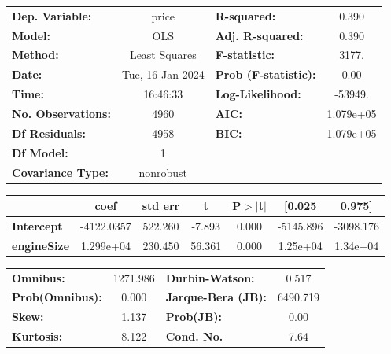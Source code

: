 \documentclass[
  letterpaper,
  DIV=11,
  numbers=noendperiod]{scrreprt}
\begin{document}
\begin{center}
\begin{tabular}{lclc}
\toprule
\textbf{Dep. Variable:}    &      price       & \textbf{  R-squared:         } &     0.390   \\
\textbf{Model:}            &       OLS        & \textbf{  Adj. R-squared:    } &     0.390   \\
\textbf{Method:}           &  Least Squares   & \textbf{  F-statistic:       } &     3177.   \\
\textbf{Date:}             & Tue, 16 Jan 2024 & \textbf{  Prob (F-statistic):} &     0.00    \\
\textbf{Time:}             &     16:46:33     & \textbf{  Log-Likelihood:    } &   -53949.   \\
\textbf{No. Observations:} &        4960      & \textbf{  AIC:               } & 1.079e+05   \\
\textbf{Df Residuals:}     &        4958      & \textbf{  BIC:               } & 1.079e+05   \\
\textbf{Df Model:}         &           1      & \textbf{                     } &             \\
\textbf{Covariance Type:}  &    nonrobust     & \textbf{                     } &             \\
\bottomrule
\end{tabular}
\begin{tabular}{lcccccc}
                    & \textbf{coef} & \textbf{std err} & \textbf{t} & \textbf{P$> |$t$|$} & \textbf{[0.025} & \textbf{0.975]}  \\
\midrule
\textbf{Intercept}  &   -4122.0357  &      522.260     &    -7.893  &         0.000        &    -5145.896    &    -3098.176     \\
\textbf{engineSize} &    1.299e+04  &      230.450     &    56.361  &         0.000        &     1.25e+04    &     1.34e+04     \\
\bottomrule
\end{tabular}
\begin{tabular}{lclc}
\textbf{Omnibus:}       & 1271.986 & \textbf{  Durbin-Watson:     } &    0.517  \\
\textbf{Prob(Omnibus):} &   0.000  & \textbf{  Jarque-Bera (JB):  } & 6490.719  \\
\textbf{Skew:}          &   1.137  & \textbf{  Prob(JB):          } &     0.00  \\
\textbf{Kurtosis:}      &   8.122  & \textbf{  Cond. No.          } &     7.64  \\
\bottomrule
\end{tabular}
\end{center}
\end{document}
